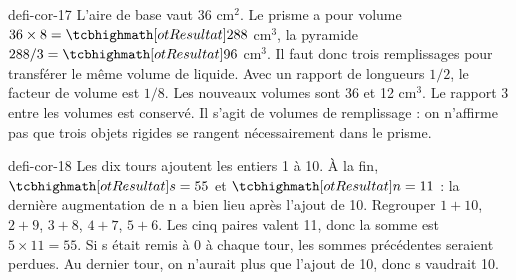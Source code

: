 \begin{blocEdition}{defi-cor-17}
L’aire de base vaut 36 cm$^2$. Le prisme a pour volume $36\times8=\res{288}$ cm$^3$, la pyramide $288/3=\res{96}$ cm$^3$. Il faut donc trois remplissages pour transférer le même volume de liquide.
Avec un rapport de longueurs $1/2$, le facteur de volume est $1/8$. Les nouveaux volumes sont 36 et 12 cm$^3$.
Le rapport 3 entre les volumes est conservé. Il s’agit de volumes de remplissage : on n’affirme pas que trois objets rigides se rangent nécessairement dans le prisme.\label{fig-defi-cor-17}

\end{blocEdition}
\begin{blocEdition}{defi-cor-18}
Les dix tours ajoutent les entiers 1 à 10. À la fin, $\res{s=55}$ et $\res{n=11}$ : la dernière augmentation de n a bien lieu après l’ajout de 10.
Regrouper $1+10$, $2+9$, $3+8$, $4+7$, $5+6$. Les cinq paires valent 11, donc la somme est $5\times11=55$.
Si s était remis à 0 à chaque tour, les sommes précédentes seraient perdues. Au dernier tour, on n’aurait plus que l’ajout de 10, donc s vaudrait 10.\label{fig-defi-cor-18}

\end{blocEdition}
